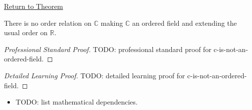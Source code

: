 \newpage
{}
\label{prf:c-is-not-an-ordered-field}

\begin{remark*}[Return]
\hyperref[thm:c-is-not-an-ordered-field]{Return to Theorem}
\end{remark*}

\begin{theorem*}
There is no order relation on \(\mathbb{C}\) making \(\mathbb{C}\) an ordered
field and extending the usual order on \(\mathbb{R}\).
\end{theorem*}

\begin{proof}[Professional Standard Proof]
\LRAProofBodyStart
TODO: professional standard proof for c-is-not-an-ordered-field.
\end{proof}

\begin{proof}[Detailed Learning Proof]
\LRAProofBodyStart
TODO: detailed learning proof for c-is-not-an-ordered-field.
\end{proof}

\begin{remark*}
\end{remark*}

\begin{dependencies}
\begin{itemize}
  \item TODO: list mathematical dependencies.
\end{itemize}
\end{dependencies}

\clearpage

